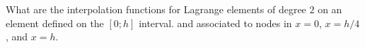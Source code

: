 \bexo

What are the interpolation functions for Lagrange elements of degree $2$ on an element defined on the  $[0;h]$ interval. and associated to nodes in $x=0$, $x=h/4$, and $x=h$.

\eexo

\solution{

}